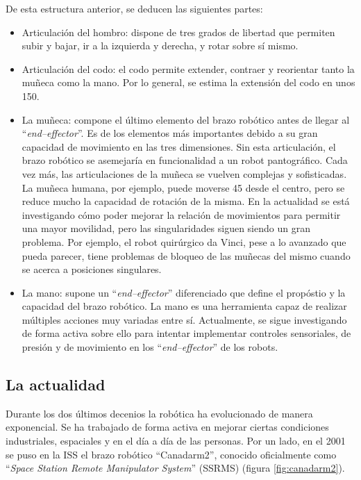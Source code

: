 De esta estructura anterior, se deducen las siguientes partes:

\begin{itemize}
    \item Articulación del hombro: dispone de tres grados de libertad que permiten
    subir y bajar, ir a la izquierda y derecha, y rotar sobre sí mismo.
    \item Articulación del codo: el codo permite extender, contraer y reorientar tanto
    la muñeca como la mano. Por lo general, se estima la extensión del codo en unos
    150\textdegree.
    \item La muñeca: compone el último elemento del brazo robótico antes de llegar
    al ``\textit{end--effector}''. Es de los elementos más importantes debido a su
    gran capacidad de movimiento en las tres dimensiones. Sin esta articulación,
    el brazo robótico se asemejaría en funcionalidad a un robot pantográfico. Cada vez más,
    las articulaciones de la muñeca se vuelven complejas y sofisticadas. La muñeca humana,
    por ejemplo, puede moverse 45\textdegree{} desde el centro, pero se reduce mucho la
    capacidad de rotación de la misma. En la actualidad se está investigando cómo poder
    mejorar la relación de movimientos para permitir una mayor movilidad, pero las 
    singularidades siguen siendo un gran problema. Por ejemplo, el robot quirúrgico
    da Vinci, pese a lo avanzado que pueda parecer, tiene problemas de bloqueo de las muñecas
    del mismo cuando se acerca a posiciones singulares.
    \item La mano: supone un ``\textit{end--effector}'' diferenciado que define el propóstio
    y la capacidad del brazo robótico. La mano es una herramienta capaz de realizar múltiples
    acciones muy variadas entre sí. Actualmente, se sigue investigando de forma activa sobre
    ello para intentar implementar controles sensoriales, de presión y de movimiento en los
    ``\textit{end--effector}'' de los robots.
\end{itemize}

\subsection{La actualidad}

Durante los dos últimos decenios la robótica ha evolucionado de manera exponencial. Se ha
trabajado de forma activa en mejorar ciertas condiciones industriales, espaciales y
en el día a día de las personas. Por un lado, en el 2001 se puso en la ISS el brazo
robótico ``Canadarm2'', conocido oficialmente como 
``\textit{Space Station Remote Manipulator System}'' (SSRMS) (figura \ref{fig:canadarm2}).

